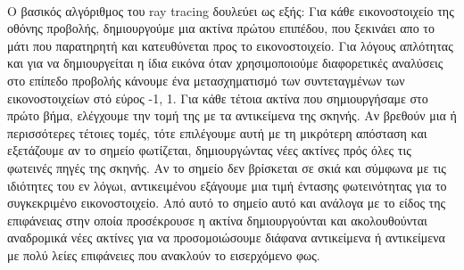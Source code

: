 \begin{sloppypar}
\paragraph{}
	O βασικός αλγόριθμος του ray tracing δουλεύει ως εξής: Για κάθε εικονοστοιχείο της οθόνης προβολής, δημιουργούμε μια ακτίνα
πρώτου επιπέδου, που ξεκινάει απο το μάτι που παρατηρητή και κατευθύνεται προς το εικονοστοιχείο. Για λόγους απλότητας και για να
δημιουργείται η ίδια εικόνα όταν χρησιμοποιούμε διαφορετικές αναλύσεις στο επίπεδο προβολής κάνουμε ένα μετασχηματισμό των 
συντεταγμένων των εικονοστοιχείων στό εύρος -1, 1. Για κάθε τέτοια ακτίνα που σημιουργήσαμε στο πρώτο βήμα, ελέγχουμε την τομή
της με τα αντικείμενα της σκηνής. Αν βρεθούν μια ή περισσότερες τέτοιες τομές, τότε επιλέγουμε αυτή με τη μικρότερη απόσταση και
εξετάζουμε αν το σημείο φωτίζεται, δημιουργώντας νέες ακτίνες πρός όλες τις φωτεινές πηγές της σκηνής. Αν το σημείο δεν βρίσκεται
σε σκιά και σύμφωνα με τις ιδιότητες του εν λόγωι, αντικειμένου εξάγουμε μια τιμή έντασης φωτεινότητας για το συγκεκριμένο εικονοστοιχείο. 
Από αυτό το σημείο αυτό και ανάλογα με το είδος της επιφάνειας στην οποία προσέκρουσε η ακτίνα δημιουργούνται και ακολουθούνται
αναδρομικά νέες ακτίνες για να προσομοιώσουμε διάφανα αντικείμενα ή αντικείμενα με πολύ λείες επιφάνειες που ανακλούν το εισερχόμενο
φως.



\end{sloppypar}

